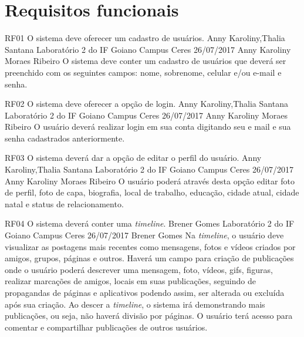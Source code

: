  \section{Requisitos funcionais}
 	
 \requisitoFuncional
 {RF01}
 {O sistema deve oferecer um cadastro de usuários.}
 {Anny Karoliny,Thalia Santana}
 {Laboratório 2 do IF Goiano Campus Ceres}
 {26/07/2017}
 {Anny Karoliny Moraes Ribeiro}
 {O sistema deve conter um cadastro de usuários que deverá ser preenchido com os seguintes campos: nome, sobrenome, celular e/ou e-mail e senha.
 }
 
 \requisitoFuncional
 {RF02}
 {O sistema deve oferecer a opção de login.}
 {Anny Karoliny,Thalia Santana}
 {Laboratório 2 do IF Goiano Campus Ceres}
 {26/07/2017}
 {Anny Karoliny Moraes Ribeiro}
 {O usuário deverá realizar login em sua conta digitando seu e mail e sua senha cadastrados anteriormente.
 }
 
 \requisitoFuncional
 {RF03}
 {O sistema deverá dar a opção de editar o perfil do usuário.}
 {Anny Karoliny,Thalia Santana}
 {Laboratório 2 do IF Goiano Campus Ceres}
 {26/07/2017}
 {Anny Karoliny Moraes Ribeiro}
 {O usuário poderá através desta opção editar foto de perfil, foto de capa, biografia, local de trabalho, educação, cidade atual, cidade natal e status de relacionamento.
 }
 
 \requisitoFuncional
 {RF04}
 {O sistema deverá conter uma \textit{timeline}.}
 {Brener Gomes}
 {Laboratório 2 do IF Goiano Campus Ceres}
 {26/07/2017}
 {Brener Gomes}
 {Na \textit{timeline}, o usuário deve visualizar as postagens mais recentes como mensagens, fotos e vídeos criados por amigos, grupos, páginas e outros. Haverá um campo para criação de publicações onde o usuário poderá descrever uma mensagem, foto, vídeos, gifs, figuras, realizar marcações de amigos, locais em suas publicações, seguindo de propagandas de páginas e aplicativos podendo assim, ser alterada ou excluída após sua criação. Ao descer a \textit{timeline}, o sistema irá demonstrando mais publicações, ou seja, não haverá divisão por páginas. O usuário terá acesso para comentar e compartilhar publicações de outros usuários.
 }
 

